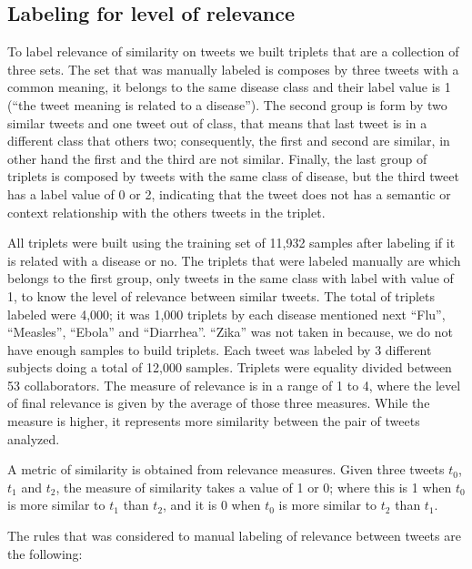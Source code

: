 \documentclass[12pt]{report}
\begin{document}
\subsection{Labeling for level of relevance} \label{data_relevance_labeling}

To label relevance of similarity on tweets we built triplets that are a collection of three sets. The set that was manually labeled is composes by three tweets with a common meaning, it belongs to the same disease class and their label value is 1 (``the tweet meaning is related to a disease''). The second group is form by two similar tweets and one tweet out of class, that means that last tweet is in a different class that others two; consequently, the first and second are similar, in other hand the first and the third are not similar. Finally, the last group of triplets is composed by tweets with the same class of disease, but the third tweet has a label value of 0 or 2, indicating that the tweet does not has a semantic or context relationship with the others tweets in the triplet.

All triplets were built using the training set of 11,932 samples after labeling if it is related with a disease or no. The triplets that were labeled manually are which belongs to the first group, only tweets in the same class with label with value of 1, to know the level of relevance between similar tweets. The total of triplets labeled were 4,000; it was 1,000 triplets by each disease mentioned next ``Flu'', ``Measles'', ``Ebola'' and ``Diarrhea''. ``Zika'' was not taken in because, we do not have enough samples to build triplets. Each tweet was labeled by 3 different subjects doing a total of 12,000 samples. Triplets were equality divided between 53 collaborators.  The measure of relevance is in a range of 1 to 4, where the level of final relevance is given by the average of those three measures. While the measure is higher, it represents more similarity between the pair of tweets analyzed. 

A metric of similarity is obtained from relevance measures. Given three tweets $t_0$, $t_1$ and $t_2$, the measure of similarity takes a value of 1 or 0; where this is 1 when $t_0$ is more similar to $t_1$ than $t_2$, and it is 0 when $t_0$ is more similar to $t_2$ than $t_1$.

The rules that was considered to manual labeling of relevance between tweets are the following:
\end{document}
